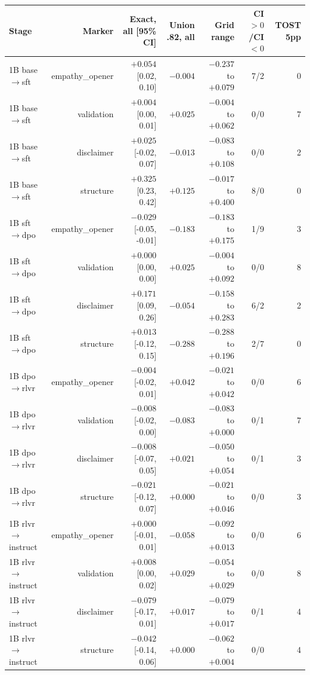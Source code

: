 \begin{tabular}{lrrrrrr}
\toprule
Stage & Marker & Exact, all [95\% CI] & Union .82, all & Grid range & CI$>0$/CI$<0$ & TOST 5pp \\
\midrule
1B base$\to$sft & empathy\_opener & $+0.054$ [0.02, 0.10] & $-0.004$ & $-0.237$ to $+0.079$ & 7/2 & 0 \\
1B base$\to$sft & validation & $+0.004$ [0.00, 0.01] & $+0.025$ & $-0.004$ to $+0.062$ & 0/0 & 7 \\
1B base$\to$sft & disclaimer & $+0.025$ [-0.02, 0.07] & $-0.013$ & $-0.083$ to $+0.108$ & 0/0 & 2 \\
1B base$\to$sft & structure & $+0.325$ [0.23, 0.42] & $+0.125$ & $-0.017$ to $+0.400$ & 8/0 & 0 \\
1B sft$\to$dpo & empathy\_opener & $-0.029$ [-0.05, -0.01] & $-0.183$ & $-0.183$ to $+0.175$ & 1/9 & 3 \\
1B sft$\to$dpo & validation & $+0.000$ [0.00, 0.00] & $+0.025$ & $-0.004$ to $+0.092$ & 0/0 & 8 \\
1B sft$\to$dpo & disclaimer & $+0.171$ [0.09, 0.26] & $-0.054$ & $-0.158$ to $+0.283$ & 6/2 & 2 \\
1B sft$\to$dpo & structure & $+0.013$ [-0.12, 0.15] & $-0.288$ & $-0.288$ to $+0.196$ & 2/7 & 0 \\
1B dpo$\to$rlvr & empathy\_opener & $-0.004$ [-0.02, 0.01] & $+0.042$ & $-0.021$ to $+0.042$ & 0/0 & 6 \\
1B dpo$\to$rlvr & validation & $-0.008$ [-0.02, 0.00] & $-0.083$ & $-0.083$ to $+0.000$ & 0/1 & 7 \\
1B dpo$\to$rlvr & disclaimer & $-0.008$ [-0.07, 0.05] & $+0.021$ & $-0.050$ to $+0.054$ & 0/1 & 3 \\
1B dpo$\to$rlvr & structure & $-0.021$ [-0.12, 0.07] & $+0.000$ & $-0.021$ to $+0.046$ & 0/0 & 3 \\
1B rlvr$\to$instruct & empathy\_opener & $+0.000$ [-0.01, 0.01] & $-0.058$ & $-0.092$ to $+0.013$ & 0/0 & 6 \\
1B rlvr$\to$instruct & validation & $+0.008$ [0.00, 0.02] & $+0.029$ & $-0.054$ to $+0.029$ & 0/0 & 8 \\
1B rlvr$\to$instruct & disclaimer & $-0.079$ [-0.17, 0.01] & $+0.017$ & $-0.079$ to $+0.017$ & 0/1 & 4 \\
1B rlvr$\to$instruct & structure & $-0.042$ [-0.14, 0.06] & $+0.000$ & $-0.062$ to $+0.004$ & 0/0 & 4 \\

\end{tabular}
